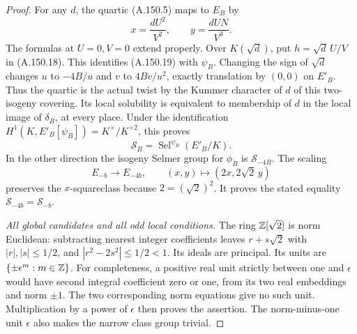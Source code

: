 \begin{proof}
For any \(d\), the quartic (A.150.5) maps to \(E_B\) by
\[
           x=\frac{dU^2}{V^2},\qquad
           y=\frac{dUN}{V^3}.
\tag{A.150.19}
\]
The formulas at \(U=0,V=0\) extend properly.
Over \(K(\sqrt d)\), put \(h=\sqrt d\,U/V\) in
(A.150.18).  This identifies (A.150.19) with \(\psi_B\).
Changing the sign of \(\sqrt d\) changes \(u\) to
\(-4B/u\) and \(v\) to \(4Bv/u^2\), exactly translation
by \((0,0)\) on \(E'_B\).
Thus the quartic is the actual twist by the Kummer
character of \(d\) of this two-isogeny covering.
Its local solubility is equivalent to membership of
\(d\) in the local image of \(\delta_B\), at every place.
Under the identification
\(H^1(K,E'_B[\psi_B])=K^\times/K^{\times2}\), this proves
\[
                   \mathcal S_B
                     =\operatorname{Sel}^{\psi_B}(E'_B/K).
\tag{A.150.20}
\]
In the other direction the isogeny Selmer group for
\(\phi_B\) is \(\mathcal S_{-4B}\).
The scaling
\[
 E_{-b}\longrightarrow E_{-4b},\qquad
                (x,y)\longmapsto(2x,2\sqrt2\,y)
\tag{A.150.21}
\]
preserves the \(x\)-squareclass because \(2=(\sqrt2)^2\).
It proves the stated equality \(\mathcal S_{-4b}=\mathcal S_{-b}\).

\emph{All global candidates and all odd local conditions.}
The ring \(\mathbb Z[\sqrt2]\) is norm Euclidean: subtracting
nearest integer coefficients leaves \(r+s\sqrt2\) with
\(|r|,|s|\le1/2\), and
\(|r^2-2s^2|\le1/2<1\).
Its ideals are principal.
Its units are \(\{\pm\epsilon^m:m\in\mathbb Z\}\).
For completeness, a positive real unit strictly between
one and \(\epsilon\) would have second integral coefficient
zero or one, from its two real embeddings and norm
\(\pm1\).  The two corresponding norm equations give
no such unit.  Multiplication by a power of \(\epsilon\)
then proves the assertion.
The norm-minus-one unit \(\epsilon\) also makes the
narrow class group trivial.


\end{proof}
